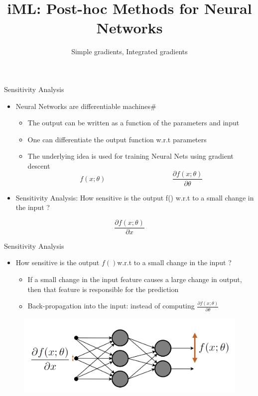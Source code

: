 \documentclass[11pt,compress,t,notes=noshow, aspectratio=169, xcolor=table]{beamer}
\title{iML: Post-hoc Methods for Neural Networks}
\subtitle{Simple gradients, Integrated gradients}
\begin{document}
	\maketitle
	\graphicspath{ {./figure/} }

\begin{frame}{Sensitivity Analysis}
    \begin{itemize}
        \item Neural Networks are differentiable machines#
        \begin{itemize}
            \item The output can be written as a function of the parameters and input
            \item One can differentiate the output function w.r.t parameters
            \item The underlying idea is used for training Neural Nets using gradient descent
            \begin{equation*}
                f(x;\theta)\hspace{4cm}  \frac{\partial f(x;\theta)}{\partial\theta}
            \end{equation*}
        \end{itemize}
        \item Sensitivity Analysis: How sensitive is the output f() w.r.t to a small change in the
input ?
    \end{itemize}
    \pause
    \bigskip
     \begin{equation*}
                 \frac{\partial f(x;\theta)}{\partial x}
            \end{equation*}
\end{frame}
	
\begin{frame}{Sensitivity Analysis}
    \begin{itemize}
        \item How sensitive is the output $f() $w.r.t to a small change in the input ?
        \begin{itemize}
            \item If a small change in the input feature causes a large change in output, then that
feature is responsible for the prediction
\item Back-propagation into the input: instead of computing \quad $\frac{\partial f(x;\theta)}{\partial\theta}$
        \end{itemize}
    \end{itemize}
\begin{figure}
    \centering
    \includegraphics[scale=.45]{bild14}
\end{figure}    
\end{frame}
\end{document}
